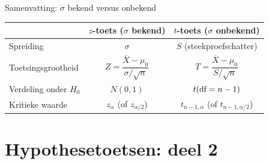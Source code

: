     \begin{frame}{Samenvatting: $\sigma$ bekend versus onbekend}
        \begin{center}
            \renewcommand{\arraystretch}{1.5}
            \begin{tabular}{lcc}
                \toprule
                                            & $z$-toets ($\sigma$ bekend) & $t$-toets ($\sigma$ onbekend) \\
                \midrule
                    Spreiding               & $\sigma$ & $S$ (steekproefschatter) \\
                    Toetsingsgrootheid      & $Z = \dfrac{\overline{X} - \mu_0}{\sigma/\sqrt{n}}$ & $T = \dfrac{\overline{X} - \mu_0}{S/\sqrt{n}}$ \\
                    Verdeling onder $H_0$   & $N(0,1)$ & $t(\text{df}=n-1)$ \\
                    Kritieke waarde         & $z_{\alpha}$ (of $z_{\alpha/2}$) & $t_{n-1,\alpha}$ (of $t_{n-1,\alpha/2}$) \\
                \bottomrule
            \end{tabular}
        \end{center}
    \end{frame}

    \section{Hypothesetoetsen: deel 2}

